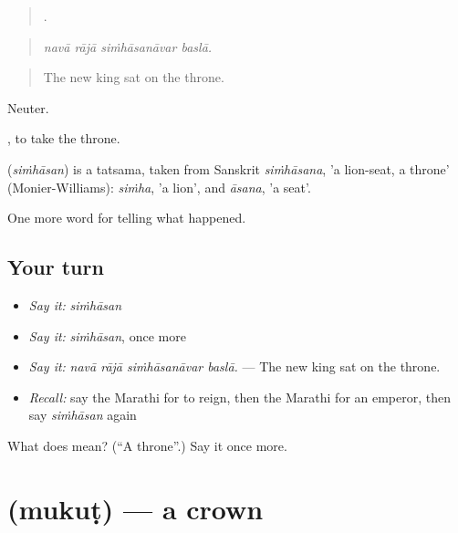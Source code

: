 \begin{quote}
   .
\end{quote}

\begin{quote}
\emph{navā rājā siṁhāsanāvar baslā.}
\end{quote}

\begin{quote}
The new king sat on the throne.
\end{quote}

Neuter.

 , to take the throne.

\begin{cousinweb}
\textbf{} (\emph{siṁhāsan}) is a tatsama, taken from Sanskrit \emph{siṁhāsana}, 'a lion-seat, a throne' (Monier-Williams): \emph{siṁha}, 'a lion', and \emph{āsana}, 'a seat'.
\end{cousinweb}

\begin{grammarlens}[title={What you've built}]
One more word for telling what happened.
\end{grammarlens}

\subsection*{Your turn}
\begin{itemize}
\raggedright
  \item \emph{Say it:} \emph{siṁhāsan}
  \item \emph{Say it:} \emph{siṁhāsan}, once more
  \item \emph{Say it:} \emph{navā rājā siṁhāsanāvar baslā.} — The new king sat on the throne.
  \item \emph{Recall:} say the Marathi for to reign, then the Marathi for an emperor, then say \emph{siṁhāsan} again
\end{itemize}

\begin{tcolorbox}[breakable,colback=teal!4,colframe=teal!35!black,title={Before you move on}]
What does  mean? (\textquotedblleft{}A throne\textquotedblright{}.) Say it once more.
\end{tcolorbox}
\section[\texorpdfstring{\mr{मुकुट} (mukuṭ)}{मुकुट (mukuṭ)}]{ (mukuṭ) — a crown}

